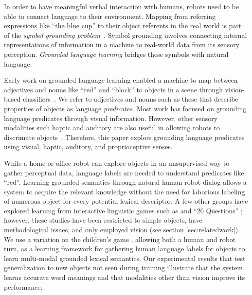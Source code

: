 In order to have meaningful verbal interaction with humans, robots need to be able to connect language to their environment. 
Mapping from referring expressions like ``the blue cup'' to their object referents in the real world is part of the \textit{symbol grounding problem}~\cite{harnad:phys90}. 
Symbol grounding involves connecting internal representations of information in a machine to real-world data from its sensory perception. \textit{Grounded language learning} bridges these symbols with natural language. 

Early work on grounded language learning enabled a machine to map between adjectives and nouns like ``red'' and ``block'' to objects in a scene through vision-based classifiers~\cite{roy:evocomm01}.
We refer to adjectives and nouns such as these that describe properties of objects as language \textit{predicates}.
Most work has focused on grounding language predicates through visual information.
However, other sensory modalities such haptic and auditory are also useful in allowing robots to discrimate objects~\cite{sinapov:icra14}.
Therefore, this paper explors grounding language predicates using visual, haptic, auditory, and proprioceptive senses. 


While a home or office robot can explore objects in an unsupervised way to gather perceptual data, language labels are needed to understand predicates like ``red''.
Learning grounded semantics through natural human-robot dialog allows a system to acquire the relevant knowledge without the need for laborious labeling of numerous object for every potential lexical descriptor.
A few other groups have explored learning from interactive linguistic games such as \ispy and ``20 Questions'' \cite{parde:ijcai15,vogel:aaai10}; however, these studies have been restricted to simple objects, have methodological issues, and only employed vision (see section \ref{sec:relatedwork}).
We use a variation on the children's game \ispy, allowing both a human and robot turn, as a learning framework for gathering human language labels for objects to learn multi-modal grounded lexical semantics.
Our experimental results that test generalization to new objects not seen during training illustrate that the system learns accurate word meanings and that modalities other than vision improve its performance.